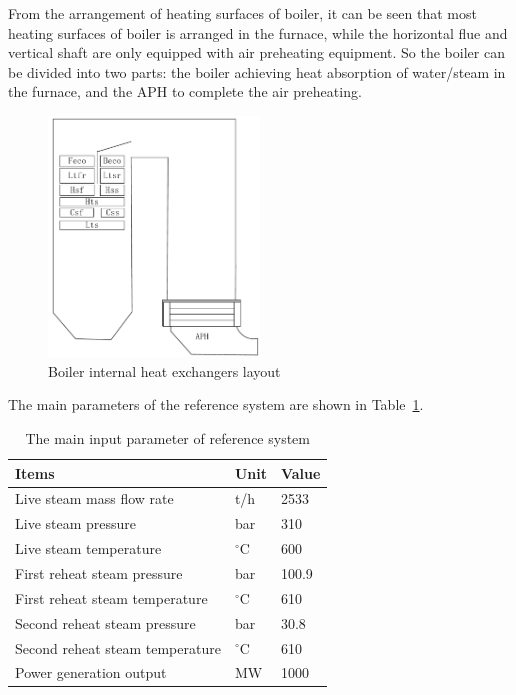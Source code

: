 \documentclass[preprint,12pt]{elsarticle}
\begin{document}
From the arrangement of heating surfaces of boiler, it can be seen that most heating surfaces of boiler is arranged in the furnace, while the horizontal flue and vertical shaft are only equipped with air preheating equipment. So the boiler can be divided into two parts: the boiler achieving heat absorption of water/steam in the furnace, and the APH to complete the air preheating.
\begin{figure}[htbp]
\centering
\includegraphics[width=0.5\textwidth]{fig/boiler_surface}
\caption{Boiler internal heat exchangers layout} 
\label{fig:boiler_surface}
\end{figure}


The main  parameters of the reference system are shown in Table~\ref{tab:ref input}.

\begin{table}[htbp]
\caption{The main input parameter of reference system }
\label{tab:ref input}
\centering
\begin{tabular}{lll}
\toprule 
Items & Unit & Value\tabularnewline
\midrule
 Live steam mass flow rate 	    	&t/h 			&2533 \\
 Live steam pressure 		    	&bar 			&310\\
 Live steam temperature		     	&$^\circ$C		&600		\\
 First reheat steam pressure    	&bar			&100.9		\\
 First reheat steam temperature  	&$^\circ$C		&610		\\
 Second reheat steam pressure    	&bar			&30.8		\\
 Second reheat steam temperature 	&$^\circ$C		&610		\\
 Power generation output 			&MW				&1000		\\
\bottomrule
\end{tabular}	
\end{table}
\end{document}
